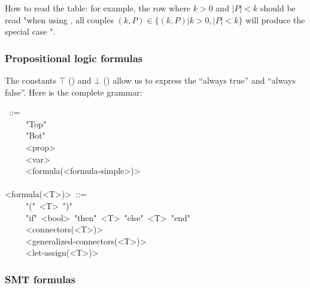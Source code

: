 \noindent How to read the table: for example, the row where $k>0$ and
$\vert P\vert<k$ should be read "when using , all couples
$(k,P) \in \{(k,P)|k>0,\vert P\vert<k\}$ will produce the special case
".%

\subsubsection{Propositional logic formulas}\label{sec-propositional-logic-formulas}%

\noindent The constants $\top$ () and $\bot$ () allow us to express
the \textquotedblleft{}always true\textquotedblright{} and \textquotedblleft{}always false\textquotedblright{}. Here is the complete grammar:%
\begin{mdpre}%
~::=\\
~~~~\textbar{}~"Top"\\
~~~~\textbar{}~"Bot"\\
~~~~\textbar{}~{\textless{}prop\textgreater{}}\\
~~~~\textbar{}~{\textless{}var\textgreater{}}\\
~~~~\textbar{}~{\textless{}formula(\textless{}formula-simple\textgreater{})\textgreater{}}\\
\\
{\textless{}formula(\textless{}T\textgreater{})\textgreater{}}~::=\\
~~~~\textbar{}~"("~{\textless{}T\textgreater{}}~")"\\
~~~~\textbar{}~"if"~{\textless{}bool\textgreater{}}~"then"~{\textless{}T\textgreater{}}~"else"~{\textless{}T\textgreater{}}~"end"\\
~~~~\textbar{}~{\textless{}connectors(\textless{}T\textgreater{})\textgreater{}}\\
~~~~\textbar{}~{\textless{}generalized-connectors(\textless{}T\textgreater{})\textgreater{}}\\
~~~~\textbar{}~{\textless{}let-assign(\textless{}T\textgreater{})\textgreater{}}\\
\end{mdpre}
\subsubsection{SMT formulas}\label{sec-smt-formulas}%

